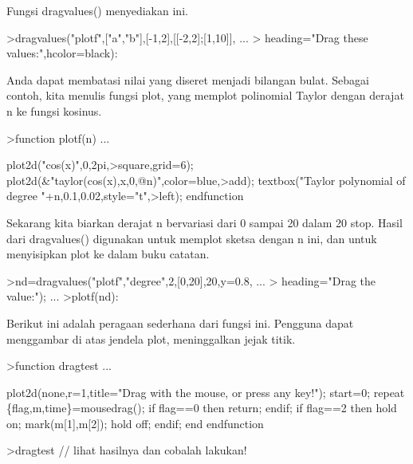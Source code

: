 \documentclass[12pt,Times new roman,letterpaper]{book}
\begin{document}
\begin{eulernootebook}
\begin{eulercomment}
\begin{eulercomment}
\begin{eulernootebook}
\begin{eulercomment}
\begin{eulercomment}
\begin{eulercomment}
\begin{eulercomment}
\begin{eulercomment}
\begin{eulercomment}
\begin{eulercomment}
\begin{eulernotebook}
\begin{eulercomment}
\begin{eulercomment}
\begin{eulercomment}
\begin{eulercomment}
\begin{eulercomment}
Fungsi dragvalues() menyediakan ini.
\end{eulercomment}
\begin{eulerprompt}
>dragvalues("plotf",["a","b"],[-1,2],[[-2,2];[1,10]], ...
>  heading="Drag these values:",hcolor=black):
\end{eulerprompt}
\begin{eulercomment}
Anda dapat membatasi nilai yang diseret menjadi bilangan bulat.
Sebagai contoh, kita menulis fungsi plot, yang memplot polinomial
Taylor dengan derajat n ke fungsi kosinus.
\end{eulercomment}
\begin{eulerprompt}
>function plotf(n) ...
\end{eulerprompt}
\begin{eulerudf}
  plot2d("cos(x)",0,2pi,>square,grid=6);
  plot2d(&"taylor(cos(x),x,0,@n)",color=blue,>add);
  textbox("Taylor polynomial of degree "+n,0.1,0.02,style="t",>left);
  endfunction
\end{eulerudf}
\begin{eulercomment}
Sekarang kita biarkan derajat n bervariasi dari 0 sampai 20 dalam 20
stop. Hasil dari dragvalues() digunakan untuk memplot sketsa dengan n
ini, dan untuk menyisipkan plot ke dalam buku catatan.
\end{eulercomment}
\begin{eulerprompt}
>nd=dragvalues("plotf","degree",2,[0,20],20,y=0.8, ...
>   heading="Drag the value:"); ...
>plotf(nd):
\end{eulerprompt}
\begin{eulercomment}
Berikut ini adalah peragaan sederhana dari fungsi ini. Pengguna dapat
menggambar di atas jendela plot, meninggalkan jejak titik.
\end{eulercomment}
\begin{eulerprompt}
>function dragtest ...
\end{eulerprompt}
\begin{eulerudf}
    plot2d(none,r=1,title="Drag with the mouse, or press any key!");
    start=0;
    repeat
      \{flag,m,time\}=mousedrag();
      if flag==0 then return; endif;
      if flag==2 then
        hold on; mark(m[1],m[2]); hold off;
      endif;
    end
  endfunction
\end{eulerudf}
\begin{eulerprompt}
>dragtest // lihat hasilnya dan cobalah lakukan!

\end{eulerprompt}
\end{eulercomment}
\end{eulercomment}
\end{eulercomment}
\end{eulercomment}
\end{eulernotebook}
\end{eulercomment}
\end{eulercomment}
\end{eulercomment}
\end{eulercomment}
\end{eulercomment}
\end{eulercomment}
\end{eulercomment}
\end{eulernootebook}
\end{eulercomment}
\end{eulercomment}
\end{eulernootebook}
\end{document}

